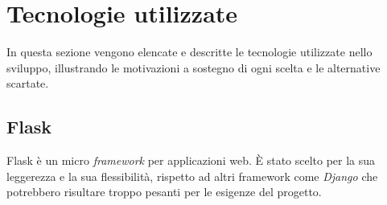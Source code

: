 \documentclass[10pt, a4paper]{article}
\begin{document}
\newpage
\section{Tecnologie utilizzate}
In questa sezione vengono elencate e descritte le tecnologie utilizzate nello sviluppo, illustrando le motivazioni a sostegno di ogni scelta e le alternative scartate.

\subsection{Flask}
Flask è un micro \textit{framework\pg} per applicazioni web. È stato scelto per la sua leggerezza e la sua flessibilità, rispetto ad altri framework come \textit{Django\pg} che potrebbero risultare troppo pesanti per le esigenze del progetto.
\end{document}
